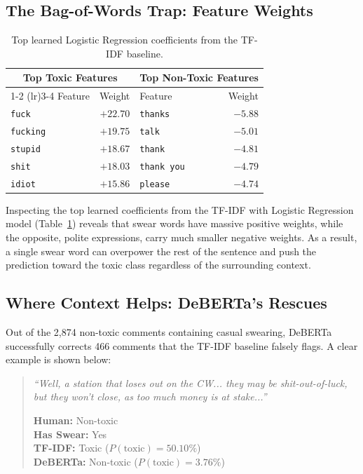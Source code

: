 \documentclass[11pt]{article}
\begin{document}
\subsection{The Bag-of-Words Trap: Feature Weights}

\begin{table}[ht]
  \centering
  \caption{Top learned Logistic Regression coefficients from the
  TF-IDF baseline.}
  \label{tab:lr_weights}
  \small
  \setlength{\tabcolsep}{4pt}
  \begin{tabular}{lr lr}
    \toprule
    \multicolumn{2}{c}{\textbf{Top Toxic Features}} &
    \multicolumn{2}{c}{\textbf{Top Non-Toxic Features}} \\
    \cmidrule(lr){1-2} \cmidrule(lr){3-4}
    Feature & Weight & Feature & Weight \\
    \midrule
    \texttt{fuck} & $+22.70$ & \texttt{thanks} & $-5.88$ \\
    \texttt{fucking} & $+19.75$ & \texttt{talk} & $-5.01$ \\
    \texttt{stupid} & $+18.67$ & \texttt{thank} & $-4.81$ \\
    \texttt{shit} & $+18.03$ & \texttt{thank you} & $-4.79$ \\
    \texttt{idiot} & $+15.86$ & \texttt{please} & $-4.74$ \\
    \bottomrule
  \end{tabular}
\end{table}

Inspecting the top learned coefficients from the TF-IDF with Logistic
Regression model (Table~\ref{tab:lr_weights}) reveals that swear
words have massive positive weights, while the opposite, polite
expressions, carry much smaller negative weights. As a result, a
single swear word can overpower the rest of the sentence and push the
prediction toward the toxic class regardless of the surrounding context.

\subsection{Where Context Helps: DeBERTa's Rescues}

Out of the 2,874 non-toxic comments containing casual swearing, DeBERTa
successfully corrects 466 comments that the TF-IDF baseline falsely
flags. A clear example is shown below:

\begin{quote}
  \small
  \textit{``Well, a station that loses out on the CW... they may be
  shit-out-of-luck, but they won't close, as too much money is at stake...''}
  \par\noindent
  \textbf{Human:} Non-toxic \\
  \textbf{Has Swear:} Yes \\
  \textbf{TF-IDF:} Toxic ($P(\text{toxic}) = 50.10\%$) \\
  \textbf{DeBERTa:} Non-toxic ($P(\text{toxic}) = 3.76\%$)
\end{quote}
\end{document}
